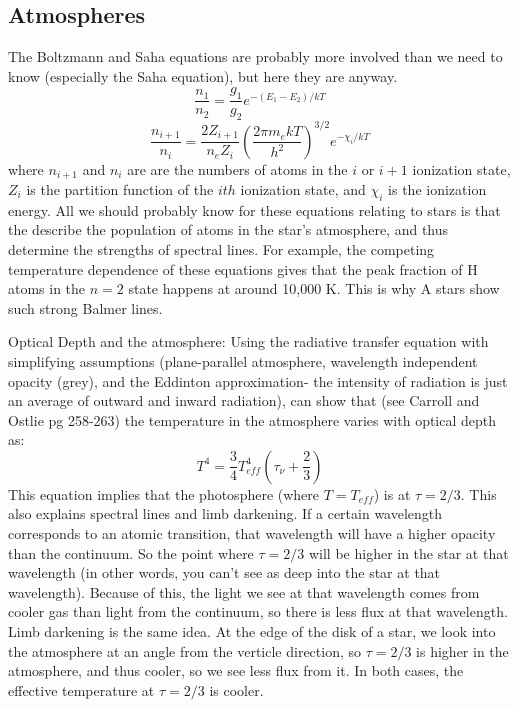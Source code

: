 \subsection{Atmospheres}
The Boltzmann and Saha equations are probably more involved than we need to know (especially the 
Saha equation), but here they are anyway.
\begin{equation}
\frac{n_1}{n_2}=\frac{g_1}{g_2}e^{-(E_1-E_2)/kT}
\end{equation}
\begin{equation}
\frac{n_{i+1}}{n_i}=\frac{2Z_{i+1}}{n_eZ_i}\left(\frac{2\pi m_ekT}{h^2}\right)^{3/2}e^{-\chi_i/kT}
\end{equation}
where $n_{i+1}$ and $n_i$ are are the numbers of atoms in the $i$ or $i+1$ ionization state, 
$Z_i$ is the partition function of the $ith$ ionization state, and $\chi_i$ is the ionization 
energy.  All we should probably know for these equations relating to stars is that the describe 
the population of atoms in the star's atmosphere, and thus determine the strengths of spectral 
lines.  For example, the competing temperature dependence of these equations gives that the 
peak fraction of H atoms in the $n=2$ state happens at around 10,000 K.  This is why A stars show 
such strong Balmer lines.

Optical Depth and the atmosphere:
Using the radiative transfer equation with simplifying assumptions (plane-parallel atmosphere, 
wavelength independent opacity (grey), and the Eddinton approximation- the intensity of radiation 
is just an average of outward and inward radiation), can show that (see Carroll and Ostlie pg 
258-263) the temperature in the 
atmosphere varies with optical depth as:
\begin{equation}
T^4=\frac{3}{4}T_{eff}^4\left(\tau_{\nu}+\frac{2}{3}\right)
\end{equation}
This equation implies that the photosphere (where $T=T_{eff}$) is at $\tau=2/3$.  This also 
explains spectral lines and limb darkening.  If a certain wavelength corresponds to an atomic 
transition, that wavelength will have a higher opacity than the continuum.  So the point 
where $\tau=2/3$ will be higher in the star at that wavelength (in other words, you can't 
see as deep into the star at that wavelength).  Because of this, the light we see at that 
wavelength comes from cooler gas than light from the continuum, so there is less flux at that 
wavelength.  Limb darkening is the same idea.  At the edge of the disk of a star, we look into 
the atmosphere at an angle from the verticle direction, so $\tau=2/3$ is higher in the atmosphere, 
and thus cooler, so we see less flux from it.  In both cases, the effective temperature at 
$\tau=2/3$ is cooler.

